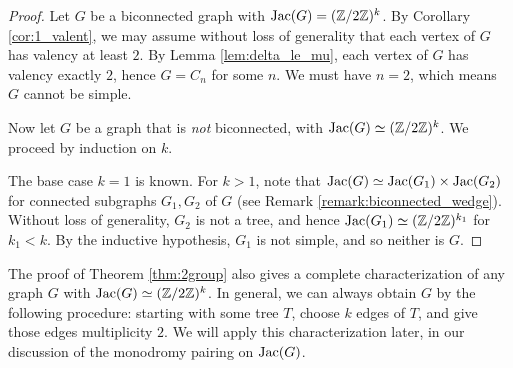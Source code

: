 \documentclass{amsart}
\begin{document}
\begin{proof}
  Let $G$ be a biconnected graph with $\operatorname{Jac}(G) = (\mathbb{Z}/2\mathbb{Z})^k$. By
  Corollary \ref{cor:1_valent}, we may assume without loss of
  generality that each vertex of $G$ has valency at least $2$. By
  Lemma \ref{lem:delta_le_mu}, each vertex of $G$ has valency exactly
  $2$, hence $G = C_n$ for some $n$. We must have $n=2$, which means
  $G$ cannot be simple.

  Now let $G$ be a graph that is \emph{not} biconnected, with $\operatorname{Jac}(G)
  \simeq (\mathbb{Z}/2\mathbb{Z})^k$. We proceed by induction on $k$.
  
  The base case $k=1$ is known. For $k > 1$, note that $\operatorname{Jac}(G) \simeq
  \operatorname{Jac}(G_1) \times \operatorname{Jac}(G_2)$ for connected subgraphs $G_1, G_2$ of
  $G$ (see Remark \ref{remark:biconnected_wedge}). Without loss of
  generality, $G_2$ is not a tree, and hence $\operatorname{Jac}(G_1) \simeq
  (\mathbb{Z}/2\mathbb{Z})^{k_1}$ for $k_1 < k$. By the inductive hypothesis, $G_1$ is
  not simple, and so neither is $G$.
\end{proof}

\begin{remark}
  \label{remark:2group_characterize}
  The proof of Theorem \ref{thm:2group} also gives a complete
  characterization of any graph $G$ with $\operatorname{Jac}(G) \simeq
  (\mathbb{Z}/2\mathbb{Z})^k$. In general, we can always obtain $G$ by the following
  procedure: starting with some tree $T$, choose $k$ edges of $T$, and
  give those edges multiplicity $2$. We will apply this
  characterization later, in our discussion of the monodromy pairing
  on $\operatorname{Jac}(G)$.
\end{remark}
\end{document}
